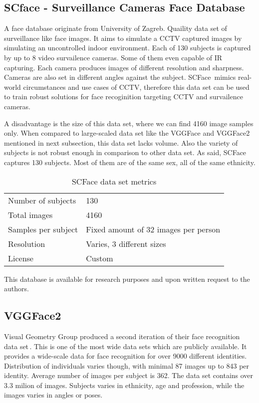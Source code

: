 \subsection{SCface - Surveillance Cameras Face Database}

A face database originate from University of Zagreb. Quaility data set of surveillance like face images. It aims to simulate a CCTV captured images by simulating an uncontrolled indoor environment. Each of 130 subjects is captured by up to 8 video survailence cameras. Some of them even capable of IR capturing. Each camera produces images of different resolution and sharpness. Cameras are also set in different angles against the subject. SCFace\,\cite{scface} mimics real-world circumstances and use cases of CCTV, therefore this data set can be used to train robust solutions for face recoginition targeting CCTV and survailence cameras.

A disadvantage is the size of this data set, where we can find \num{4160} image samples only. When compared to large-scaled data set like the VGGFace and VGGFace2 mentioned in next subsection, this data set lacks volume. Also the variety of subjects is not robust enough in comparison to other data set. As said, SCFace captures 130 subjects. Most of them are of the same sex, all of the same ethnicity.

\begin{table}[ht]
    \centering
    \caption{SCFace data set metrics}

    \begin{tabularx}{0.75\textwidth}{l|l}
        \toprule
        Number of subjects & 130 \\
        Total images & \num{4160} \\
        Samples per subject & Fixed amount of 32 images per person \\
        Resolution & Varies, 3 different sizes \\
        License & Custom \\
        \bottomrule
    \end{tabularx}
\end{table}

This database is available for research purposes and upon written request to the authors.


\subsection{VGGFace2}

Visual Geometry Group produced a second iteration of their face recognition data set\,\cite{VVGFace2}. This is one of the most wide data sets which are publicly available. It provides a wide-scale data for face recognition for over 9000 different identities. Distribution of individuals varies though, with minimal 87 images up to 843 per identity. Average number of images per subject is 362. The data set contains over \num{3.3} milion of images. Subjects varies in ethnicity, age and profession, while the images varies in angles or poses.

